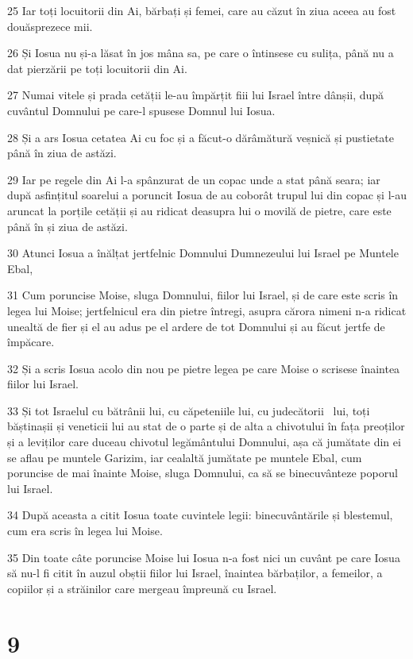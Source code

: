 \par 25 Iar toți locuitorii din Ai, bărbați și femei, care au căzut în ziua aceea au fost douăsprezece mii.
\par 26 Și Iosua nu și-a lăsat în jos mâna sa, pe care o întinsese cu sulița, până nu a dat pierzării pe toți locuitorii din Ai.
\par 27 Numai vitele și prada cetății le-au împărțit fiii lui Israel între dânșii, după cuvântul Domnului pe care-l spusese Domnul lui Iosua.
\par 28 Și a ars Iosua cetatea Ai cu foc și a făcut-o dărâmătură veșnică și pustietate până în ziua de astăzi.
\par 29 Iar pe regele din Ai l-a spânzurat de un copac unde a stat până seara; iar după asfințitul soarelui a poruncit Iosua de au coborât trupul lui din copac și l-au aruncat la porțile cetății și au ridicat deasupra lui o movilă de pietre, care este până în și ziua de astăzi.
\par 30 Atunci Iosua a înălțat jertfelnic Domnului Dumnezeului lui Israel pe Muntele Ebal,
\par 31 Cum poruncise Moise, sluga Domnului, fiilor lui Israel, și de care este scris în legea lui Moise; jertfelnicul era din pietre întregi, asupra cărora nimeni n-a ridicat unealtă de fier și el au adus pe el ardere de tot Domnului și au făcut jertfe de împăcare.
\par 32 Și a scris Iosua acolo din nou pe pietre legea pe care Moise o scrisese înaintea fiilor lui Israel.
\par 33 Și tot Israelul cu bătrânii lui, cu căpeteniile lui, cu judecătorii  lui, toți băștinașii și veneticii lui au stat de o parte și de alta a chivotului în fața preoților și a leviților care duceau chivotul legământului Domnului, așa că jumătate din ei se aflau pe muntele Garizim, iar cealaltă jumătate pe muntele Ebal, cum poruncise de mai înainte Moise, sluga Domnului, ca să se binecuvânteze poporul lui Israel.
\par 34 După aceasta a citit Iosua toate cuvintele legii: binecuvântările și blestemul, cum era scris în legea lui Moise.
\par 35 Din toate câte poruncise Moise lui Iosua n-a fost nici un cuvânt pe care Iosua să nu-l fi citit în auzul obștii fiilor lui Israel, înaintea bărbaților, a femeilor, a copiilor și a străinilor care mergeau împreună cu Israel.

\chapter{9}

